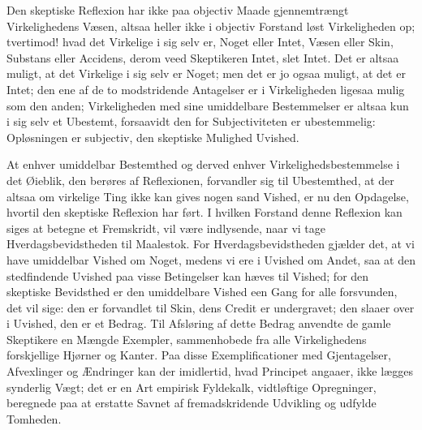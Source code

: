 \documentclass[12pt]{book}
\newcommand{\opage}[1]{\marginnote{\footnotesize\textit{[#1]}}}
\begin{document}
Den skeptiske Reflexion har ikke paa objectiv Maade gjennemtrængt Virkelighedens Væsen, altsaa heller ikke i objectiv Forstand løst Virkeligheden op; tvertimod! hvad det Virkelige i sig selv er, Noget eller Intet, Væsen eller Skin, Substans eller Accidens, derom veed Skeptikeren Intet, slet Intet. Det er altsaa muligt, at det Virkelige i sig selv er Noget; men det er jo ogsaa muligt, at det er Intet; den ene af de to modstridende Antagelser er i Virkeligheden ligesaa mulig som den anden; Virkeligheden med sine umiddelbare Bestemmelser er altsaa kun i sig selv et Ubestemt, forsaavidt den for Subjectiviteten er ubestemmelig: Opløsningen er subjectiv, den skeptiske Mulighed Uvished.

At enhver umiddelbar Bestemthed og derved enhver Virkelighedsbestemmelse i det Øieblik, den berøres af Reflexionen, forvandler sig til Ubestemthed, at der altsaa om virkelige Ting ikke kan gives nogen sand Vished, er nu den Opdagelse, hvortil den skeptiske Reflexion har ført. I hvilken Forstand denne Reflexion kan siges at betegne et Fremskridt, vil være indlysende, naar vi tage Hverdagsbevidstheden til Maalestok. For Hverdagsbevidstheden gjælder det, at vi have umiddelbar Vished om Noget, medens vi ere i Uvished om Andet, saa at
\opage{215}den stedfindende Uvished paa visse Betingelser kan hæves til Vished; for den skeptiske Bevidsthed er den umiddelbare Vished een Gang for alle forsvunden, det vil sige: den er forvandlet til Skin, dens Credit er undergravet; den slaaer over i Uvished, den er et Bedrag. Til Afsløring af dette Bedrag anvendte de gamle Skeptikere en Mængde Exempler, sammenhobede fra alle Virkelighedens forskjellige Hjørner og Kanter. Paa disse Exemplificationer med Gjentagelser, Afvexlinger og Ændringer kan der imidlertid, hvad Principet angaaer, ikke lægges synderlig Vægt; det er en Art empirisk Fyldekalk, vidtløftige Opregninger, beregnede paa at erstatte Savnet af fremadskridende Udvikling og udfylde Tomheden.
\end{document}
